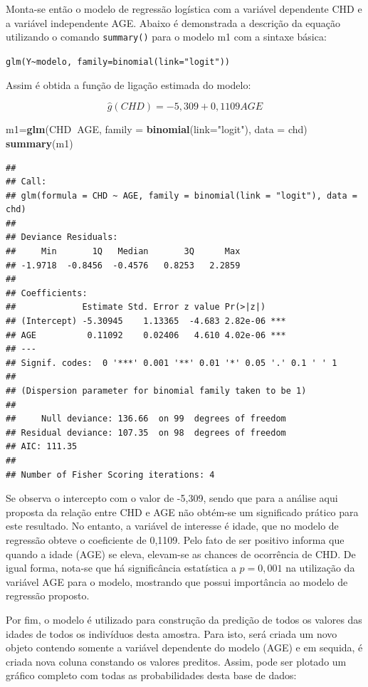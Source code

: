 \documentclass[12pt,brazil,]{book}
\newenvironment{Shaded}{\begin{snugshade}}{\end{snugshade}}
\newcommand{\DataTypeTok}[1]{\textcolor[rgb]{0.13,0.29,0.53}{#1}}
\newcommand{\KeywordTok}[1]{\textcolor[rgb]{0.13,0.29,0.53}{\textbf{#1}}}
\newcommand{\NormalTok}[1]{#1}
\newcommand{\OperatorTok}[1]{\textcolor[rgb]{0.81,0.36,0.00}{\textbf{#1}}}
\newcommand{\StringTok}[1]{\textcolor[rgb]{0.31,0.60,0.02}{#1}}
\begin{document}
Monta-se então o modelo de regressão logística com a variável dependente
CHD e a variável independente AGE. Abaixo é demonstrada a descrição da
equação utilizando o comando \texttt{summary()} para o modelo m1 com a
sintaxe básica:

\texttt{glm(Y\textasciitilde{}modelo,\ family=binomial(link="logit"))}

Assim é obtida a função de ligação estimada do modelo:

\[
\hat g(CHD) = -5,309 +0,1109AGE
\]

\begin{Shaded}
\begin{Highlighting}[]
\NormalTok{m1=}\KeywordTok{glm}\NormalTok{(CHD}\OperatorTok{~}\NormalTok{AGE, }\DataTypeTok{family =} \KeywordTok{binomial}\NormalTok{(}\DataTypeTok{link=}\StringTok{"logit"}\NormalTok{), }\DataTypeTok{data =}\NormalTok{ chd)}
\KeywordTok{summary}\NormalTok{(m1)}
\end{Highlighting}
\end{Shaded}

\begin{verbatim}
## 
## Call:
## glm(formula = CHD ~ AGE, family = binomial(link = "logit"), data = chd)
## 
## Deviance Residuals: 
##     Min       1Q   Median       3Q      Max  
## -1.9718  -0.8456  -0.4576   0.8253   2.2859  
## 
## Coefficients:
##             Estimate Std. Error z value Pr(>|z|)    
## (Intercept) -5.30945    1.13365  -4.683 2.82e-06 ***
## AGE          0.11092    0.02406   4.610 4.02e-06 ***
## ---
## Signif. codes:  0 '***' 0.001 '**' 0.01 '*' 0.05 '.' 0.1 ' ' 1
## 
## (Dispersion parameter for binomial family taken to be 1)
## 
##     Null deviance: 136.66  on 99  degrees of freedom
## Residual deviance: 107.35  on 98  degrees of freedom
## AIC: 111.35
## 
## Number of Fisher Scoring iterations: 4
\end{verbatim}

Se observa o intercepto com o valor de -5,309, sendo que para a análise
aqui proposta da relação entre CHD e AGE não obtém-se um significado
prático para este resultado. No entanto, a variável de interesse é
idade, que no modelo de regressão obteve o coeficiente de 0,1109. Pelo
fato de ser positivo informa que quando a idade (AGE) se eleva,
elevam-se as chances de ocorrência de CHD. De igual forma, nota-se que
há significância estatística a \(p=0,001\) na utilização da variável AGE
para o modelo, mostrando que possui importância ao modelo de regressão
proposto.

Por fim, o modelo é utilizado para construção da predição de todos os
valores das idades de todos os indivíduos desta amostra. Para isto, será
criada um novo objeto contendo somente a variável dependente do modelo
(AGE) e em sequida, é criada nova coluna constando os valores preditos.
Assim, pode ser plotado um gráfico completo com todas as probabilidades
desta base de dados:
\end{document}
